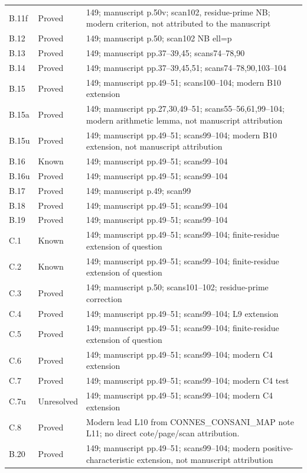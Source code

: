 {\begin{longtable}{p{1.9cm}p{1.7cm}p{10.3cm}}
B.11f & Proved & 149; manuscript p.50v; scan102, residue-prime NB; modern criterion, not attributed to the manuscript \\
B.12 & Proved & 149; manuscript p.50; scan102 NB ell=p \\
B.13 & Proved & 149; manuscript pp.37–39,45; scans74–78,90 \\
B.14 & Proved & 149; manuscript pp.37–39,45,51; scans74–78,90,103–104 \\
B.15 & Proved & 149; manuscript pp.49–51; scans100–104; modern B10 extension \\
B.15a & Proved & 149; manuscript pp.27,30,49–51; scans55–56,61,99–104; modern arithmetic lemma, not manuscript attribution \\
B.15u & Proved & 149; manuscript pp.49–51; scans99–104; modern B10 extension, not manuscript attribution \\
B.16 & Known & 149; manuscript pp.49–51; scans99–104 \\
B.16u & Proved & 149; manuscript pp.49–51; scans99–104 \\
B.17 & Proved & 149; manuscript p.49; scan99 \\
B.18 & Proved & 149; manuscript pp.49–51; scans99–104 \\
B.19 & Proved & 149; manuscript pp.49–51; scans99–104 \\
C.1 & Known & 149; manuscript pp.49–51; scans99–104; finite-residue extension of question \\
C.2 & Known & 149; manuscript pp.49–51; scans99–104; finite-residue extension of question \\
C.3 & Proved & 149; manuscript p.50; scans101–102; residue-prime correction \\
C.4 & Proved & 149; manuscript pp.49–51; scans99–104; L9 extension \\
C.5 & Proved & 149; manuscript pp.49–51; scans99–104; finite-residue extension of question \\
C.6 & Proved & 149; manuscript pp.49–51; scans99–104; modern C4 extension \\
C.7 & Proved & 149; manuscript pp.49–51; scans99–104; modern C4 test \\
C.7u & Unresolved & 149; manuscript pp.49–51; scans99–104; modern C4 extension \\
C.8 & Proved & Modern lead L10 from CONNES\_CONSANI\_MAP note L11; no direct cote/page/scan attribution. \\
B.20 & Proved & 149; manuscript pp.49–51; scans99–104; modern positive-characteristic extension, not manuscript attribution \\

\end{longtable}}
